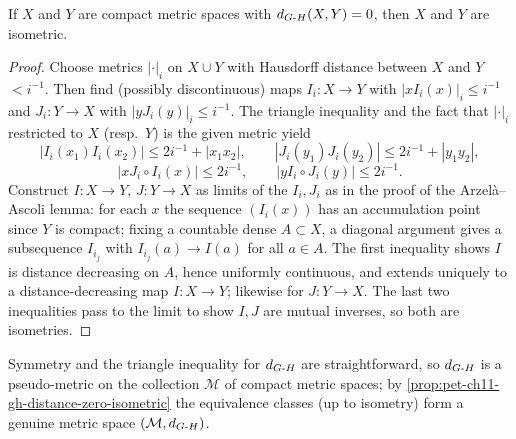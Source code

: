 \begin{proposition}
  \label{prop:pet-ch11-gh-distance-zero-isometric}
  If $X$ and $Y$ are compact metric spaces with $d_{G\text{-}H}(X,Y)=0$, then $X$ and
  $Y$ are isometric.
\end{proposition}
\begin{proof}
  Choose metrics $|\cdot|_i$ on $X\cup Y$ with Hausdorff distance between $X$
  and $Y$ $<i^{-1}$. Then find (possibly discontinuous) maps
  $I_i:X\to Y$ with $|xI_i(x)|_i\le i^{-1}$ and $J_i:Y\to X$ with
  $|yJ_i(y)|_i\le i^{-1}$. The triangle inequality and the fact that
  $|\cdot|_i$ restricted to $X$ (resp.\ $Y$) is the given metric yield
  \[
    |I_i(x_1)I_i(x_2)|\le2i^{-1}+|x_1x_2|,\qquad
    |J_i(y_1)J_i(y_2)|\le2i^{-1}+|y_1y_2|,
  \]
  \[
    |xJ_i\circ I_i(x)|\le2i^{-1},\qquad |yI_i\circ J_i(y)|\le2i^{-1}.
  \]
  Construct $I:X\to Y$, $J:Y\to X$ as limits of the $I_i,J_i$ as in the proof
  of the Arzelà--Ascoli lemma: for each $x$ the sequence $(I_i(x))$ has an
  accumulation point since $Y$ is compact; fixing a countable dense
  $A\subset X$, a diagonal argument gives a subsequence $I_{i_j}$ with
  $I_{i_j}(a)\to I(a)$ for all $a\in A$. The first inequality shows $I$ is
  distance decreasing on $A$, hence uniformly continuous, and extends
  uniquely to a distance-decreasing map $I:X\to Y$; likewise for $J:Y\to X$.
  The last two inequalities pass to the limit to show $I,J$ are mutual
  inverses, so both are isometries.
\end{proof}

\begin{remark}
  \label{rem:pet-ch11-gh-pseudo-metric-quotient}
  Symmetry and the triangle inequality for $d_{G\text{-}H}$ are straightforward, so
  $d_{G\text{-}H}$ is a pseudo-metric on the collection $\mathcal{M}$ of compact metric
  spaces; by \cref{prop:pet-ch11-gh-distance-zero-isometric} the equivalence
  classes (up to isometry) form a genuine metric space $(\mathcal{M},d_{G\text{-}H})$.
\end{remark}

